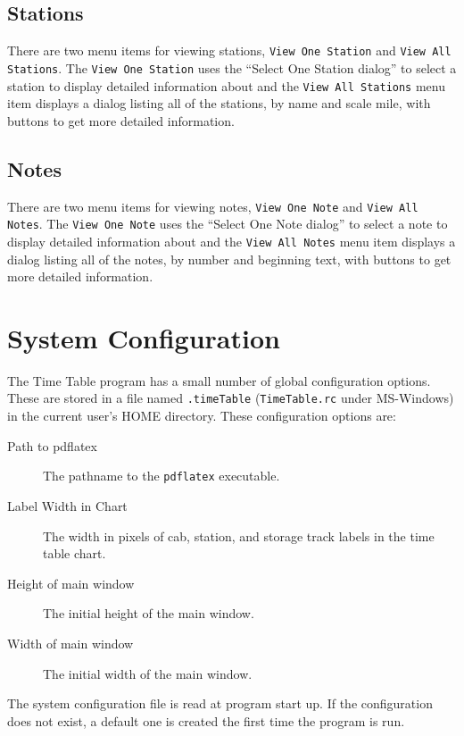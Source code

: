 \subsection{Stations}
\label{sect:tt:ViewingStations}

There are two menu items for viewing stations, \texttt{View One
Station} and \texttt{View All Stations}.  The \texttt{View One Station}
uses the ``Select One Station dialog'' to select a station to display
detailed information about and the \texttt{View All Stations} menu item
displays a dialog listing all of the stations, by name and scale mile, with
buttons to get more detailed information.

\subsection{Notes}
\label{sect:tt:ViewingNotes}

There are two menu items for viewing notes, \texttt{View One Note} and
\texttt{View All Notes}.  The \texttt{View One Note} uses the ``Select
One Note dialog'' to select a note to display detailed information
about and the \texttt{View All Notes} menu item displays a dialog
listing all of the notes, by number and beginning text, with buttons to
get more detailed information.

\section{System Configuration}

The Time Table program has a small number of global
configuration options.  These are stored in a file named
\texttt{.timeTable} (\texttt{TimeTable.rc} under MS-Windows) in the
current user's HOME directory.  These configuration options are:
\begin{description}
\item [Path to pdflatex] The pathname to the \texttt{pdflatex}
executable.
\item [Label Width in Chart] The width in pixels of cab, station, and
storage track labels in the time table chart.
\item [Height of main window] The initial height of the main window.
\item [Width of main window] The initial width of the main window.
\end{description}

The system configuration file is read at program start up.  If the
configuration does not exist, a default one is created the first time
the program is run.

